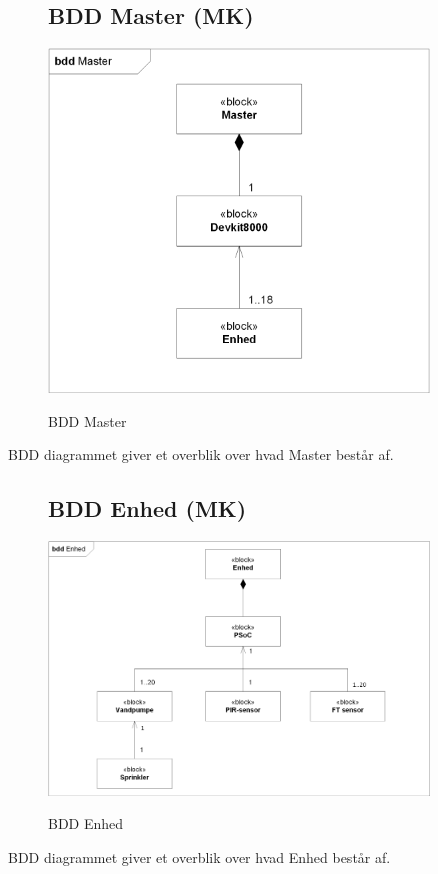 \begin{figure}[H] \centering
\subsection{BDD Master (MK)}
{\includegraphics[width=0.9\textwidth]{filer/systemarkitektur/BDD_Master}}
\caption{BDD Master}
\label{lab:bddmaster}
\raggedright
\end{figure}
BDD diagrammet giver et overblik over hvad Master består af.

\begin{figure}[H] \centering
\subsection{BDD Enhed (MK)}
{\includegraphics[width=0.9\textwidth]{filer/systemarkitektur/BDD_Enhed}}
\caption{BDD Enhed}
\label{lab:bddenhed}
\raggedright
\end{figure}
BDD diagrammet giver et overblik over hvad Enhed består af.

